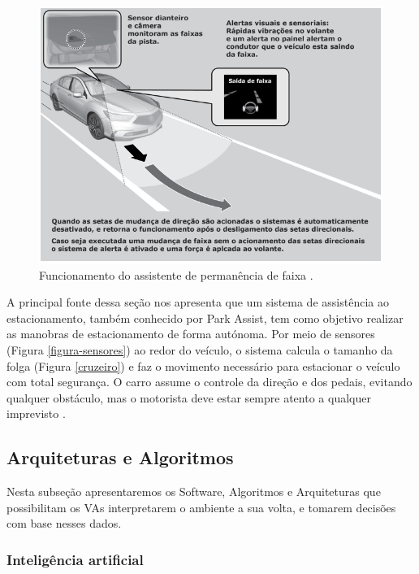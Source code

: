 \begin{figure}[H]
\centering
\includegraphics[width=\textwidth]{Figures/assistente.png}
\caption{Funcionamento do assistente de permanência de faixa \cite{caio}.}
\label{assistente}
\end{figure}



A principal fonte dessa seção nos apresenta que um sistema de assistência ao estacionamento, também conhecido por Park Assist, tem como objetivo realizar as manobras de estacionamento de forma autónoma. Por meio de sensores (Figura \ref{figura-sensores}) ao redor do veículo, o sistema calcula o tamanho da folga (Figura \ref{cruzeiro}) e faz o movimento necessário para estacionar o veículo com total segurança. O carro assume o controle da direção e dos pedais, evitando qualquer obstáculo, mas o motorista deve estar sempre atento a qualquer imprevisto \cite{caio}.

\subsection{Arquiteturas e Algoritmos} \label{arq_alg}

Nesta subseção apresentaremos os Software, Algoritmos e Arquiteturas que possibilitam os VAs interpretarem o ambiente a sua volta, e tomarem decisões com base nesses dados. 


\subsubsection{Inteligência artificial}

